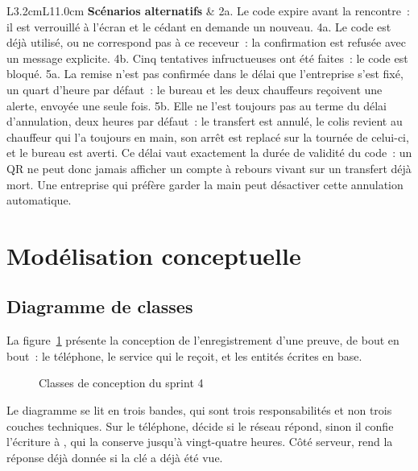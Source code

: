 \begin{small}
\begin{longtable}{L{3.2cm}L{11.0cm}}
\textbf{Scénarios alternatifs} & 2a. Le code expire avant la rencontre~: il est verrouillé à l'écran et le cédant en demande un nouveau. \newline 4a. Le code est déjà utilisé, ou ne correspond pas à ce receveur~: la confirmation est refusée avec un message explicite. \newline 4b. Cinq tentatives infructueuses ont été faites~: le code est bloqué. \newline 5a. La remise n'est pas confirmée dans le délai que l'entreprise s'est fixé, un quart d'heure par défaut~: le bureau et les deux chauffeurs reçoivent une alerte, envoyée une seule fois. \newline 5b. Elle ne l'est toujours pas au terme du délai d'annulation, deux heures par défaut~: le transfert est annulé, le colis revient au chauffeur qui l'a toujours en main, son arrêt est replacé sur la tournée de celui-ci, et le bureau est averti. Ce délai vaut exactement la durée de validité du code~: un QR ne peut donc jamais afficher un compte à rebours vivant sur un transfert déjà mort. Une entreprise qui préfère garder la main peut désactiver cette annulation automatique. \\
\hline
\end{longtable}
\end{small}

\section{Modélisation conceptuelle}

\subsection{Diagramme de classes}

La figure~\ref{fig:class-s4} présente la conception de l'enregistrement d'une preuve, de bout en bout~: le
téléphone, le service qui le reçoit, et les entités écrites en base.

\begin{figure}[H]
\centering
{}
\caption{Classes de conception du sprint 4}
\label{fig:class-s4}
\end{figure}

Le diagramme se lit en trois bandes, qui sont trois responsabilités et non trois couches techniques.
Sur le téléphone,  décide si le réseau répond, sinon il confie l'écriture à
, qui la conserve jusqu'à vingt-quatre heures. Côté serveur,
 rend la réponse déjà donnée si la clé a déjà été vue.

